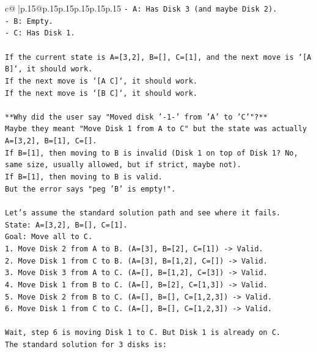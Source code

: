 \documentclass{article}
\begin{document}
{\begin{supertabular}{c@{$\;$}|p{.15\linewidth}@{}p{.15\linewidth}p{.15\linewidth}p{.15\linewidth}p{.15\linewidth}p{.15\linewidth}}
{{{\texttt{{-} A: Has Disk 3 (and maybe Disk 2).} \\
\texttt{{-} B: Empty.} \\
\texttt{{-} C: Has Disk 1.} \\
\\ 
\texttt{If the current state is A={[}3,2{]}, B={[}{]}, C={[}1{]}, and the next move is `{[}A B{]}`, it should work.} \\
\texttt{If the next move is `{[}A C{]}`, it should work.} \\
\texttt{If the next move is `{[}B C{]}`, it should work.} \\
\\ 
\texttt{**Why did the user say "Moved disk '{-}1{-}' from 'A' to 'C'"?**} \\
\texttt{Maybe they meant "Move Disk 1 from A to C" but the state was actually A={[}3,2{]}, B={[}1{]}, C={[}{]}.} \\
\texttt{If B={[}1{]}, then moving to B is invalid (Disk 1 on top of Disk 1? No, same size, usually allowed, but if strict, maybe not).} \\
\texttt{If B={[}1{]}, then moving to B is valid.} \\
\texttt{But the error says "peg 'B' is empty!".} \\
\\ 
\texttt{Let's assume the standard solution path and see where it fails.} \\
\texttt{State: A={[}3,2{]}, B={[}{]}, C={[}1{]}.} \\
\texttt{Goal: Move all to C.} \\
\texttt{1. Move Disk 2 from A to B. (A={[}3{]}, B={[}2{]}, C={[}1{]}) {-}> Valid.} \\
\texttt{2. Move Disk 1 from C to B. (A={[}3{]}, B={[}1,2{]}, C={[}{]}) {-}> Valid.} \\
\texttt{3. Move Disk 3 from A to C. (A={[}{]}, B={[}1,2{]}, C={[}3{]}) {-}> Valid.} \\
\texttt{4. Move Disk 1 from B to C. (A={[}{]}, B={[}2{]}, C={[}1,3{]}) {-}> Valid.} \\
\texttt{5. Move Disk 2 from B to C. (A={[}{]}, B={[}{]}, C={[}1,2,3{]}) {-}> Valid.} \\
\texttt{6. Move Disk 1 from C to C. (A={[}{]}, B={[}{]}, C={[}1,2,3{]}) {-}> Valid.} \\
\\ 
\texttt{Wait, step 6 is moving Disk 1 to C. But Disk 1 is already on C.} \\
\texttt{The standard solution for 3 disks is:} \\
}}}
\end{supertabular}}
\end{document}
